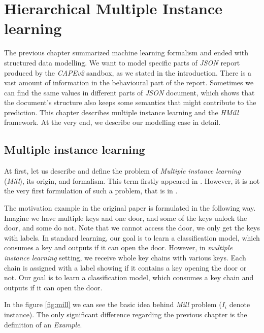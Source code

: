 \chapter{Hierarchical Multiple Instance learning} \label{chap:hmill}
The previous chapter summarized machine learning formalism and ended with structured data modelling. We want to model specific parts of \emph{JSON} report produced by the \emph{CAPEv2} sandbox, as we stated in the introduction. There is a vast amount of information in the behavioural part of the report. Sometimes we can find the same values in different parts of \emph{JSON} document, which shows that the document's structure also keeps some semantics that might contribute to the prediction. This chapter describes multiple instance learning and the \emph{HMill} framework. At the very end, we describe our modelling case in detail.


\section{Multiple instance learning}
At first, let us describe and define the problem of \emph{Multiple instance learning} (\emph{Mill}), its origin, and formalism. This term firstly appeared in \cite{Dietterich1997}. However, it is not the very first formulation of such a problem, that is in \cite{Keeler1991}.

The motivation example in the original paper \cite{Dietterich1997} is formulated in the following way. Imagine we have multiple keys and one door, and some of the keys unlock the door, and some do not. Note that we cannot access the door, we only get the keys with labels. In standard learning, our goal is to learn a classification model, which consumes a key and outputs if it can open the door. However, in \emph{multiple instance learning} setting, we receive whole key chains with various keys. Each chain is assigned with a label showing if it contains a key opening the door or not. Our goal is to learn a classification model, which consumes a key chain and outputs if it can open the door.

In the figure \ref{fig:mill} we can see the basic idea behind \emph{Mill} problem ($I_i$ denote instance). The only significant difference regarding the previous chapter is the definition of an \emph{Example}. 
